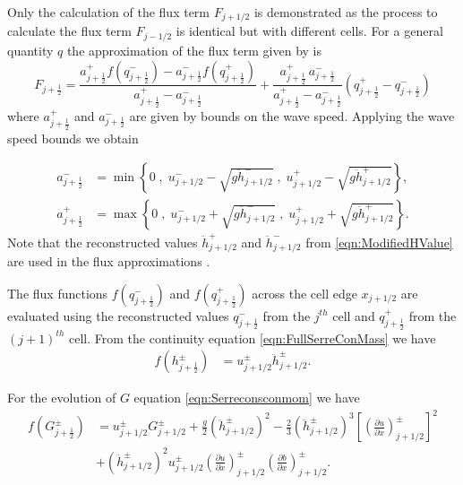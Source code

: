 \documentclass[times]{elsarticle}
\begin{document}
Only the calculation of the flux term $F_{j+1/2}$ is demonstrated as the process to calculate the flux term $F_{j-1/2}$ is identical but with different cells. For a general quantity $q$ the approximation of the flux term given by \citet{Kurganov-etal-2001-707} is
\begin{equation}\label{eqn:HLL_flux}
F_{j+\frac{1}{2}} = \dfrac{a^+_{j+\frac{1}{2}} f\left(q^-_{j+\frac{1}{2}}\right) - a^-_{j+\frac{1}{2}} f\left(q^+_{j+\frac{1}{2}}\right)}{a^+_{j+\frac{1}{2}} - a^-_{j+\frac{1}{2}}}  + \dfrac{a^+_{j+\frac{1}{2}} \, a^-_{j+\frac{1}{2}}}{a^+_{j+\frac{1}{2}} - a^-_{j+\frac{1}{2}}} \left(  q^+_{j+\frac{1}{2}} - q^-_{j+\frac{1}{2}} \right)
\end{equation}
where $a^+_{j+\frac{1}{2}}$ and $a^-_{j+\frac{1}{2}}$ are given by bounds on the wave speed. Applying the wave speed bounds \cite{Zoppou-etal-2017} we obtain

\begin{align}
a^-_{j+\frac{1}{2}} &= \min\left\lbrace 0\;,\;  u^-_{j + 1/2} - \sqrt{g  \ddot{h}^-_{j + 1/2}}  \;,\;u^+_{j + 1/2} - \sqrt{g  \ddot{h}^+_{j + 1/2}} \right\rbrace  ,\\
a^+_{j+\frac{1}{2}} &= \max\left\lbrace 0 \;,\;  u^-_{j + 1/2} + \sqrt{g \ddot{h}^-_{j + 1/2}}  \;,\;u^+_{j + 1/2} + \sqrt{g  \ddot{h}^+_{j + 1/2}} \right\rbrace .
\label{eqn:WaveSpeedBoundsFluxApprox}
\end{align}
Note that the reconstructed values $\ddot{h}^+_{j + 1/2}$ and $\ddot{h}^-_{j + 1/2}$ from \eqref{eqn:ModifiedHValue} are used in the flux approximations \cite{Klein-etal-2004-2050}.

The flux functions $f(q^-_{j+\frac{1}{2}})$ and $f(q^+_{j+\frac{1}{2}})$ across the cell edge $x_{j+1/2}$ are evaluated using the reconstructed values $q^-_{j+\frac{1}{2}}$ from the $j^{th}$ cell and $q^+_{j+\frac{1}{2}}$ from the $(j+1)^{th}$ cell. From the continuity equation \eqref{eqn:FullSerreConMass} we have
\begin{align*}
f\left(h^\pm_{j+\frac{1}{2}}\right) &= u^\pm_{j + 1/2}  \ddot{h}^\pm_{j + 1/2}.
\end{align*}

For the evolution of $G$ equation \eqref{eqn:Serreconsconmom} we have 
\begin{align}
f\left(G^\pm_{j+\frac{1}{2}}\right) &=  u^\pm_{j + 1/2} G^\pm_{j + 1/2}  + \frac{g}{2}\left(\ddot{h}^\pm_{j + 1/2} \right)^2 - \frac{2}{3}\left(\ddot{h}^\pm_{j + 1/2}\right)^3 \left[\left(\frac{\partial {u}}{\partial x} \right)^\pm_{j + 1/2} \right]^2 \nonumber\\ &+ \left(\ddot{h}^\pm_{j + 1/2}\right)^2 u^\pm_{j + 1/2} \left(\frac{\partial {u}}{\partial x} \right)^\pm_{j + 1/2} \left(\frac{\partial b}{\partial x} \right)^\pm_{j + 1/2} .
\label{eqn:FluxIrrotNum}
\end{align}
\end{document}
